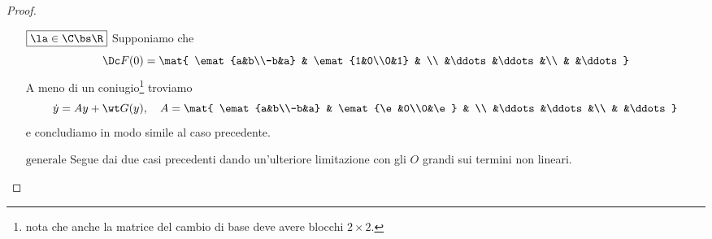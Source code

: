 \begin{proof}
\begin{itemize}
        \[0\leq \norm{\mat{y_1-y_2\\\vdots\\y_{d-1}-y_d}}^2.\]
        Cerchiamo dunque condizioni valide per $\e$ e $\norm y$:\\
        Poich\'e $\la<0$ \`e lecito fissare $\e\in(0,\abs\la)$. Per le propriet\`a degli $O$ grandi esistono $r,C>0$ tali che
        \[\norm y<r\implies \dot V(y)\leq((\la+\e)+C\norm y)\norm y^2.\]
        Ponendo ora $\la+\e+C\norm y<0$ si ha che se 
        \[r'<\min\cpa{r,\frac{\abs{\la+\e}}{C}}\]
        allora per $y\in B_{r'}(0)\bs\cpa0$ vale
        \[\dot V(y)\leq ((\la+\e)+C\norm y)\norm y^2<0,\]
        cio\`e $V$ \`e una funzione di Lyapunov stretta per $x_0$ in un opportuno cambio di base, dunque $x_0$ \`e asintoticamente stabile per il secondo teorema di Lyapunov (\ref{TeoremaLyapunov2AsintoticaStabilita}).
        \item[$\boxed{\la\in\C\bs \R}$] Supponiamo che
        \[\Dc F(0)=\mat{
        \emat{a&b\\-b&a} & \emat{1&0\\0&1}     &      \\
            &\ddots &\ddots&\\
            &       &\ddots
        }\]
        A meno di un coniugio\footnote{nota che anche la matrice del cambio di base deve avere blocchi $2\times 2$.} troviamo
        \[\dot y=Ay+\wt G(y),\quad A=\mat{
        \emat{a&b\\-b&a} & \emat{\e&0\\0&\e}     &      \\
            &\ddots &\ddots&\\
            &       &\ddots
        }\]
        e concludiamo in modo simile al caso precedente.
        \item[$\boxed{\text{generale}}$] Segue dai due casi precedenti dando un'ulteriore limitazione con gli $O$ grandi sui termini non lineari.
    \end{itemize}
    \setlength{\leftmargini}{0.5cm}
\end{proof}


